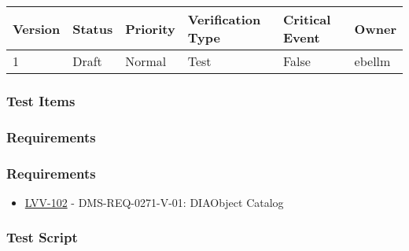 \begin{longtable}[]{@{}llllll@{}}
\toprule
Version & Status & Priority & Verification Type & Critical Event &
Owner\tabularnewline
\midrule
\endhead
1 & Draft & Normal & Test & False & ebellm\tabularnewline
\bottomrule
\end{longtable}

\hypertarget{test-items-11}{%
\subsubsection{Test Items}\label{test-items-11}}

\hypertarget{requirements-22}{%
\subsubsection{Requirements}\label{requirements-22}}

\hypertarget{requirements-23}{%
\subsubsection{Requirements}\label{requirements-23}}

\begin{itemize}
\tightlist
\item
  \href{https://jira.lsstcorp.org/browse/LVV-102}{LVV-102} -
  DMS-REQ-0271-V-01: DIAObject Catalog
\end{itemize}

\hypertarget{test-script-11}{%
\subsubsection{Test Script}\label{test-script-11}}

